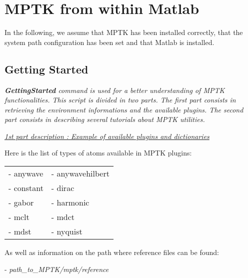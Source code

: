 \chapter{MPTK from within Matlab \label{MptkWithMatlab}}

In the following, we assume that MPTK has been installed correctly, that the system path configuration has been set and that Matlab is installed.

\section{Getting Started}

\textcolor[rgb]{0.4,0.4,0.4}{\emph{\textbf{GettingStarted} command is used for a better understanding of MPTK functionalities. This script is divided in two parts. 
The first part consists in retrieving the environment informations and the available plugins. The second part consists in describing several tutorials about MPTK utilities.}}

\vspace{0.3 cm}

\noindent \underline{\emph{1st part description : Example of available plugins and dictionaries}}

\noindent Here is the list of types of atoms available in MPTK plugins:
\begin{center}
	\begin{tabular}{ll}
			- anywave	 & - anywavehilbert \\
			- constant	 & - dirac \\
			- gabor	 & - harmonic \\
			- mclt	 & - mdct \\
			- mdst	 & - nyquist \\
	\end{tabular}
\end{center}

\noindent As well as information on the path where reference files can be found:
\begin{center}
	- \emph{path\_to\_MPTK/mptk/reference}
\end{center}


